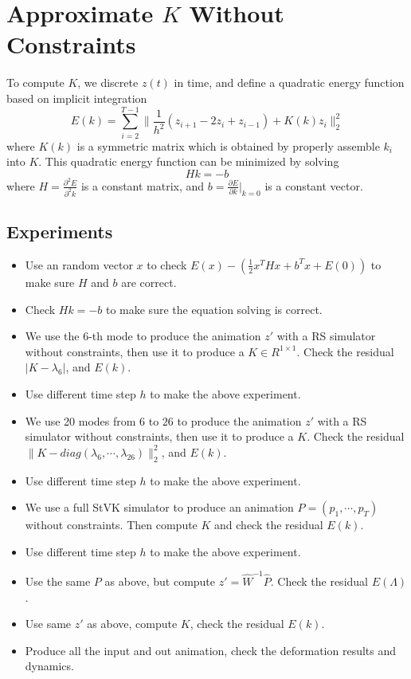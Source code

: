 \documentclass[twocolumn,a4paper]{article}
\begin{document}
\section{Approximate $K$ Without Constraints}
To compute $K$, we discrete $z(t)$ in time, and define a quadratic energy
function based on implicit integration
\begin{equation} \label{qua-en}
  E(k) = \sum_{i=2}^{T-1} \|\frac{1}{h^2}(z_{i+1}-2z_{i}+z_{i-1}) + K(k)z_i\|_2^2
\end{equation}
where $K(k)$ is a symmetric matrix which is obtained by properly assemble $k_i$
into $K$. This quadratic energy function can be minimized by solving
\begin{equation} \label{sol}
  Hk = -b
\end{equation}
where $H = \frac{\partial^2{E}}{\partial^2{k}}$ is a constant matrix, and $b =
\frac{\partial{E}}{\partial{k}}|_{k=0}$ is a constant vector. 

\subsection{Experiments}
\begin{itemize}
\item Use an random vector $x$ to check $E(x)-(\frac{1}{2}x^THx+b^Tx+E(0))$ to
  make sure $H$ and $b$ are correct.
\item Check $Hk = -b$ to make sure the equation solving is correct.
\item We use the 6-th mode to produce the animation $z'$ with a RS simulator
  without constraints, then use it to produce a $K\in R^{1\times1}$. Check the
  residual $|K-\lambda_6|$, and $E(k)$.
\item Use different time step $h$ to make the above experiment.
\item We use 20 modes from $6$ to $26$ to produce the animation $z'$ with a RS
  simulator without constraints, then use it to produce a $K$. Check the
  residual $\|K-diag(\lambda_6,\cdots,\lambda_{26})\|_2^2$, and $E(k)$.
\item Use different time step $h$ to make the above experiment.
\item We use a full StVK simulator to produce an animation $P =
  (p_1,\cdots,p_T)$ without constraints. Then compute $K$ and check the residual
  $E(k)$.
\item Use different time step $h$ to make the above experiment.
\item Use the same $P$ as above, but compute $z' = \hat{W}^{-1}\hat{P}$. Check
  the residual $E(\Lambda)$.
\item Use same $z'$ as above, compute $K$, check the residual $E(k)$.
\item Produce all the input and out animation, check the deformation results and
  dynamics.
\end{itemize}
\end{document}
